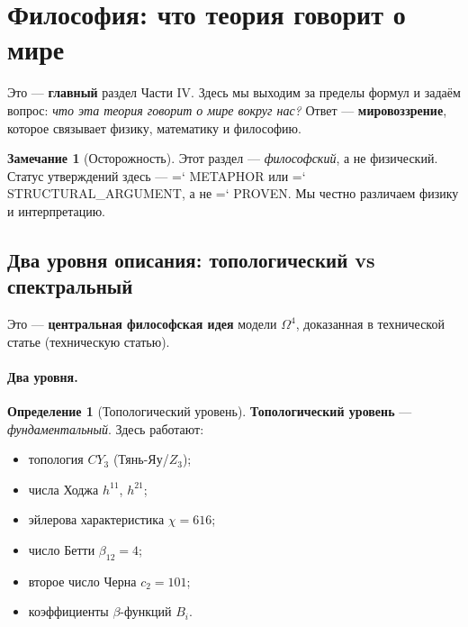 \documentclass[11pt,a4paper]{article}
\newcommand{\CY}{CY_3}
\newcommand{\Om}{\Omega^4}
\renewcommand{\texttt}[1]{{\ttfamily\hyphenchar\font=`\- #1}}
\theoremstyle{definition}
\newtheorem{definition}[theorem]{Определение}
\newtheorem{remark}[theorem]{Замечание}
\begin{document}
\section{Философия: что теория говорит о мире}
\label{sec:philosophy}

Это — \textbf{главный} раздел Части IV. Здесь мы выходим 
за пределы формул и задаём вопрос: \emph{что эта теория 
говорит о мире вокруг нас?} Ответ — \textbf{мировоззрение}, 
которое связывает физику, математику и философию.

\begin{remark}[Осторожность]
\label{rem:philosophy-caution}
Этот раздел — \emph{философский}, а не физический. Статус 
утверждений здесь — \texttt{METAPHOR} или 
\texttt{STRUCTURAL\_ARGUMENT}, а не \texttt{PROVEN}. 
Мы честно различаем физику и интерпретацию.
\end{remark}

\subsection{Два уровня описания: топологический vs спектральный}
\label{subsec:two-levels}

Это — \textbf{центральная философская идея} модели $\Om$, 
доказанная в технической статье (техническую статью).

\paragraph{Два уровня.}

\begin{definition}[Топологический уровень]
\label{def:topological-level}
\textbf{Топологический уровень} — \emph{фундаментальный}. 
Здесь работают:
\begin{itemize}
    \item топология $\CY$ (Тянь-Яу/$Z_3$);
    \item числа Ходжа $h^{11}$, $h^{21}$;
    \item эйлерова характеристика $\chi = 616$;
    \item число Бетти $\beta_{12} = 4$;
    \item второе число Черна $c_2 = 101$;
    \item коэффициенты $\beta$-функций $B_i$.
\end{itemize}
\end{definition}
\end{document}
